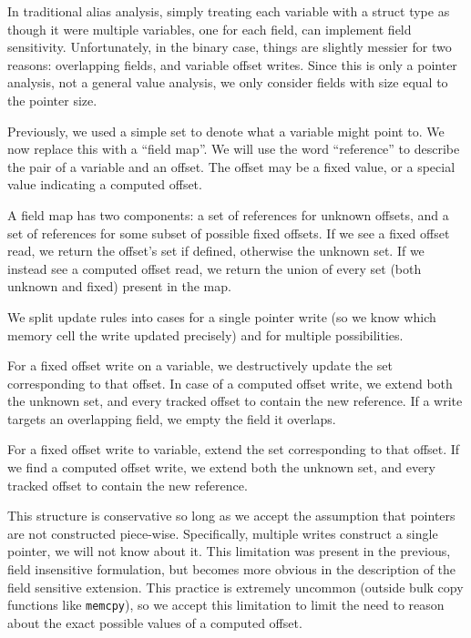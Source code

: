 In traditional alias analysis, simply treating each variable with a struct type as though it were multiple variables, one for each field, can implement field sensitivity.
Unfortunately, in the binary case, things are slightly messier for two reasons: overlapping fields, and variable offset writes.
Since this is only a pointer analysis, not a general value analysis, we only consider fields with size equal to the pointer size.

Previously, we used a simple set to denote what a variable might point to.
We now replace this with a ``field map''.
We will use the word ``reference'' to describe the pair of a variable and an offset.
The offset may be a fixed value, or a special value indicating a computed offset.

A field map has two components: a set of references for unknown offsets, and a set of references for some subset of possible fixed offsets.
If we see a fixed offset read, we return the offset's set if defined, otherwise the unknown set.
If we instead see a computed offset read, we return the union of every set (both unknown and fixed) present in the map.

We split update rules into cases for a single pointer write (so we know which memory cell the write updated precisely) and for multiple possibilities.

For a fixed offset write on a variable, we destructively update the set corresponding to that offset.
In case of a computed offset write, we extend both the unknown set, and every tracked offset to contain the new reference.
If a write targets an overlapping field, we empty the field it overlaps.

For a fixed offset write to variable, extend the set corresponding to that offset.
If we find a computed offset write, we extend both the unknown set, and every tracked offset to contain the new reference.

This structure is conservative so long as we accept the assumption that pointers are not constructed piece-wise.
Specifically, multiple writes construct a single pointer, we will not know about it.
This limitation was present in the previous, field insensitive formulation, but becomes more obvious in the description of the field sensitive extension.
This practice is extremely uncommon (outside bulk copy functions like \texttt{memcpy}), so we accept this limitation to limit the need to reason about the exact possible values of a computed offset.

